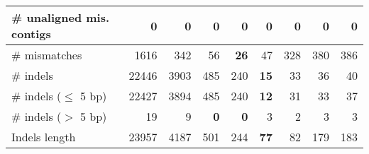 \documentclass[12pt,a4paper]{article}
\begin{document}
\begin{table}[ht]
\begin{center}
\begin{tabular}{|l*{8}{|r}|}
\# unaligned mis. contigs & 0 & 0 & 0 & 0 & 0 & 0 & 0 & 0 \\ \hline
\# mismatches & 1616 & 342 & 56 & {\bf 26} & 47 & 328 & 380 & 386 \\ \hline
\# indels & 22446 & 3903 & 485 & 240 & {\bf 15} & 33 & 36 & 40 \\ \hline
\hspace{5mm}\# indels ($\leq$ 5 bp) & 22427 & 3894 & 485 & 240 & {\bf 12} & 31 & 33 & 37 \\ \hline
\hspace{5mm}\# indels ($>$ 5 bp) & 19 & 9 & {\bf 0} & {\bf 0} & 3 & 2 & 3 & 3 \\ \hline
Indels length & 23957 & 4187 & 501 & 244 & {\bf 77} & 82 & 179 & 183 \\ \hline
\end{tabular}
\end{center}
\end{table}
\end{document}

